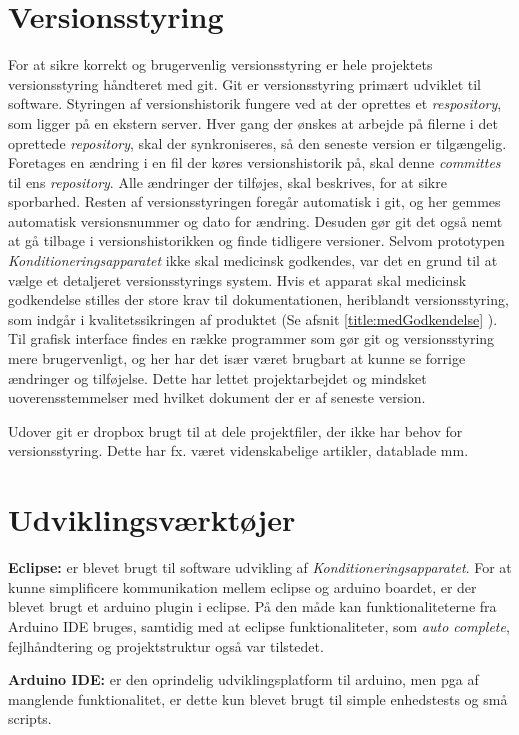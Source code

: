 \section{Versionsstyring} \label{title:versionsstyring}
For at sikre korrekt og brugervenlig versionsstyring er hele projektets versionsstyring håndteret med git. Git er versionsstyring primært udviklet til software. Styringen af versionshistorik fungere ved at der oprettes et \textit{respository}, som ligger på en ekstern server. Hver gang der ønskes at arbejde på filerne i det oprettede \textit{repository}, skal der synkroniseres, så den seneste version er tilgængelig. Foretages en ændring i en fil der køres versionshistorik på, skal denne \textit{committes} til ens \textit{repository}. Alle ændringer der tilføjes, skal beskrives, for at sikre sporbarhed. Resten af versionsstyringen foregår automatisk i git, og her gemmes automatisk versionsnummer og dato for ændring. Desuden gør git det også nemt at gå tilbage i versionshistorikken og finde tidligere versioner. 
Selvom prototypen \textit{Konditioneringsapparatet} ikke skal medicinsk godkendes, var det en grund til at vælge et detaljeret versionsstyrings system. Hvis et apparat skal medicinsk godkendelse stilles der store krav til dokumentationen, heriblandt versionsstyring, som indgår i kvalitetssikringen af produktet (Se afsnit \ref{title:medGodkendelse} ). 
Til grafisk interface findes en række programmer som gør git og versionsstyring mere brugervenligt, og her har det især været brugbart at kunne se forrige ændringer og tilføjelse. Dette har lettet projektarbejdet og mindsket uoverensstemmelser med hvilket dokument der er af seneste version. 

Udover git er dropbox brugt til at dele projektfiler, der ikke har behov for versionsstyring. Dette har fx. været videnskabelige artikler, datablade mm. 

\section{Udviklingsværktøjer}\label{title:udviklingsvaerktoejer}
\textbf{Eclipse:} er blevet brugt til software udvikling af \textit{Konditioneringsapparatet}. For at kunne simplificere kommunikation mellem eclipse og arduino boardet, er der blevet brugt et arduino plugin i eclipse. På den måde kan funktionaliteterne fra Arduino IDE bruges, samtidig med at eclipse funktionaliteter, som \textit{auto complete}, fejlhåndtering og projektstruktur også var tilstedet. 

\textbf{Arduino IDE:} er den oprindelig udviklingsplatform til arduino, men pga af manglende funktionalitet, er dette kun blevet brugt til simple enhedstests og små scripts. 

